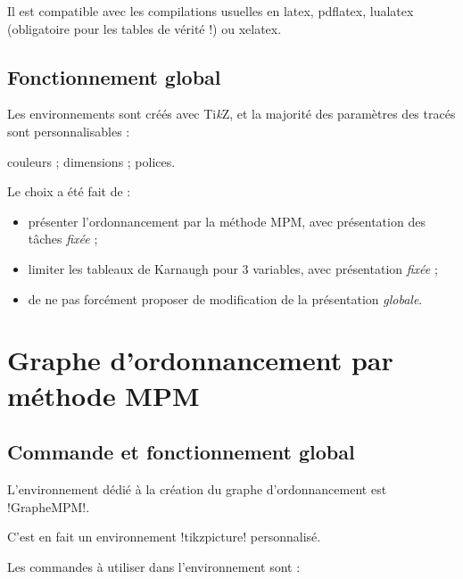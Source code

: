 \documentclass[french,a4paper,11pt]{article}
\providecommand\tikzlogo{Ti\textit{k}Z}
\let\TikZ\tikzlogo
\begin{document}
{{\begin{noteblock}
Il est compatible avec les compilations usuelles en \textsf{latex}, \textsf{pdflatex}, \textsf{lualatex} (obligatoire pour les tables de vérité !) ou \textsf{xelatex}.
\end{noteblock}

\subsection{Fonctionnement global}

\begin{tipblock}
Les environnements sont créés avec \TikZ, et la majorité des paramètres des tracés sont personnalisables :

\hfill{}couleurs ; dimensions ; polices.\hfill~
\end{tipblock}

\begin{noteblock}
Le choix a été fait de :

\begin{itemize}
	\item présenter l'ordonnancement par la méthode MPM, avec présentation des tâches \textit{fixée} ;
	\item limiter les tableaux de Karnaugh pour 3 variables, avec présentation \textit{fixée} ;
	\item de ne pas forcément proposer de modification de la présentation \textit{globale}.
\end{itemize}
\vspace*{-\baselineskip}\leavevmode
\end{noteblock}

\pagebreak

\section{Graphe d'ordonnancement par méthode MPM}

\subsection{Commande et fonctionnement global}

\begin{cautionblock}
L'environnement dédié à la création du graphe d'ordonnancement est \motcletex!GrapheMPM!.

C'est en fait un environnement \motcletex!tikzpicture! personnalisé.

\smallskip

Les commandes à utiliser dans l'environnement sont :


\end{cautionblock}}}
\end{document}
